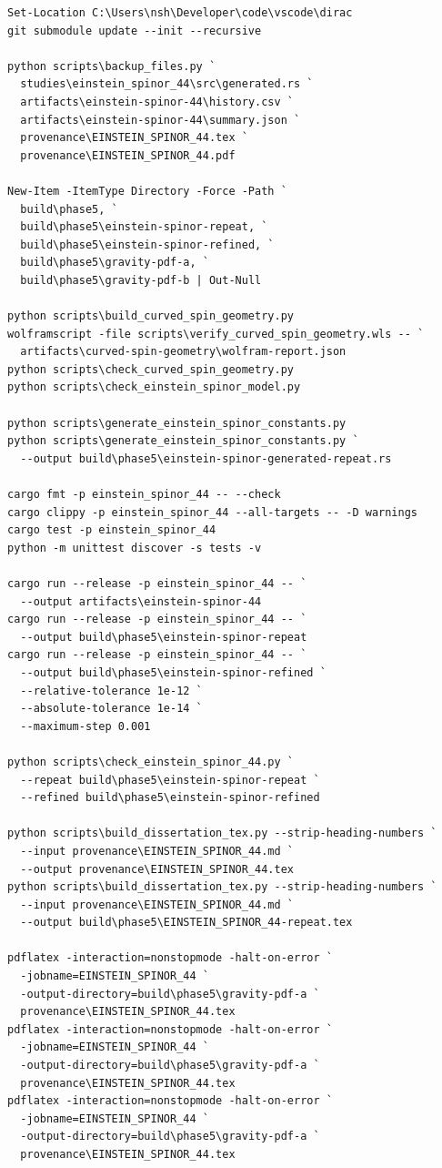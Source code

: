 \documentclass[11pt]{article}
\begin{document}
\begin{Verbatim}[fontsize=\small]
Set-Location C:\Users\nsh\Developer\code\vscode\dirac
git submodule update --init --recursive

python scripts\backup_files.py `
  studies\einstein_spinor_44\src\generated.rs `
  artifacts\einstein-spinor-44\history.csv `
  artifacts\einstein-spinor-44\summary.json `
  provenance\EINSTEIN_SPINOR_44.tex `
  provenance\EINSTEIN_SPINOR_44.pdf

New-Item -ItemType Directory -Force -Path `
  build\phase5, `
  build\phase5\einstein-spinor-repeat, `
  build\phase5\einstein-spinor-refined, `
  build\phase5\gravity-pdf-a, `
  build\phase5\gravity-pdf-b | Out-Null

python scripts\build_curved_spin_geometry.py
wolframscript -file scripts\verify_curved_spin_geometry.wls -- `
  artifacts\curved-spin-geometry\wolfram-report.json
python scripts\check_curved_spin_geometry.py
python scripts\check_einstein_spinor_model.py

python scripts\generate_einstein_spinor_constants.py
python scripts\generate_einstein_spinor_constants.py `
  --output build\phase5\einstein-spinor-generated-repeat.rs

cargo fmt -p einstein_spinor_44 -- --check
cargo clippy -p einstein_spinor_44 --all-targets -- -D warnings
cargo test -p einstein_spinor_44
python -m unittest discover -s tests -v

cargo run --release -p einstein_spinor_44 -- `
  --output artifacts\einstein-spinor-44
cargo run --release -p einstein_spinor_44 -- `
  --output build\phase5\einstein-spinor-repeat
cargo run --release -p einstein_spinor_44 -- `
  --output build\phase5\einstein-spinor-refined `
  --relative-tolerance 1e-12 `
  --absolute-tolerance 1e-14 `
  --maximum-step 0.001

python scripts\check_einstein_spinor_44.py `
  --repeat build\phase5\einstein-spinor-repeat `
  --refined build\phase5\einstein-spinor-refined

python scripts\build_dissertation_tex.py --strip-heading-numbers `
  --input provenance\EINSTEIN_SPINOR_44.md `
  --output provenance\EINSTEIN_SPINOR_44.tex
python scripts\build_dissertation_tex.py --strip-heading-numbers `
  --input provenance\EINSTEIN_SPINOR_44.md `
  --output build\phase5\EINSTEIN_SPINOR_44-repeat.tex

pdflatex -interaction=nonstopmode -halt-on-error `
  -jobname=EINSTEIN_SPINOR_44 `
  -output-directory=build\phase5\gravity-pdf-a `
  provenance\EINSTEIN_SPINOR_44.tex
pdflatex -interaction=nonstopmode -halt-on-error `
  -jobname=EINSTEIN_SPINOR_44 `
  -output-directory=build\phase5\gravity-pdf-a `
  provenance\EINSTEIN_SPINOR_44.tex
pdflatex -interaction=nonstopmode -halt-on-error `
  -jobname=EINSTEIN_SPINOR_44 `
  -output-directory=build\phase5\gravity-pdf-a `
  provenance\EINSTEIN_SPINOR_44.tex


\end{Verbatim}
\end{document}
